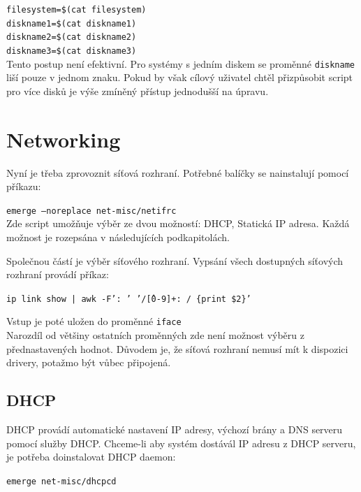 \documentclass[12pt,a4paper,twoside,]{article}
\begin{document}
{{{{{{\texttt{filesystem=\$(cat filesystem)}\\
\hspace*{1.5em}\texttt{diskname1=\$(cat diskname1)}\\
\hspace*{1.5em}\texttt{diskname2=\$(cat diskname2)}\\
\hspace*{1.5em}\texttt{diskname3=\$(cat diskname3)}\\

\hspace*{-1.5em}Tento postup není efektivní. Pro systémy s jedním diskem se proměnné \texttt{diskname} liší pouze v jednom znaku. Pokud by však cílový uživatel chtěl přizpůsobit script pro více disků je výše zmíněný přístup jednodušší na úpravu.
\newpage

\section{\textsf{Networking}}
Nyní je třeba zprovoznit síťová rozhraní. Potřebné balíčky se nainstalují pomocí příkazu:

\texttt{emerge --noreplace net-misc/netifrc}\\


\hspace{-1.5em}Zde script umožňuje výběr ze dvou možností: DHCP, Statická IP adresa. Každá možnost je rozepsána v následujících podkapitolách.

\hspace{-1.5em}Společnou částí je výběr síťového rozhraní. Vypsání všech dostupných síťových rozhraní provádí příkaz:

\texttt{ip link show | awk -F': ' '/\^[0-9]+: / \{print \$2\}'}

\hspace{-1.5em}Vstup je poté uložen do proměnné \texttt{iface}\\
Narozdíl od většiny ostatních proměnných zde není možnost výběru z přednastavených hodnot. Důvodem je, že síťová rozhraní nemusí mít k dispozici drivery, potažmo být vůbec připojená.
\subsection{\textsf{DHCP}}
DHCP provádí automatické nastavení IP adresy, výchozí brány a DNS serveru pomocí služby DHCP.
Chceme-li aby systém dostávál IP adresu z DHCP serveru, je potřeba doinstalovat DHCP daemon:

\texttt{emerge net-misc/dhcpcd}

}}}}}}
\end{document}
